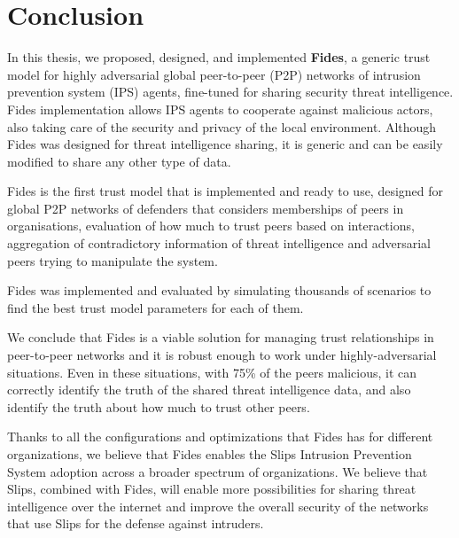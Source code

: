 \chapter{Conclusion}
\label{ch:conclusion}

In this thesis, we proposed, designed, and implemented \textbf{Fides}, a generic trust model for highly adversarial global peer-to-peer (P2P) networks of intrusion prevention system (IPS) agents, fine-tuned for sharing security threat intelligence. Fides implementation allows IPS agents to cooperate against malicious actors, also taking care of the security and privacy of the local environment. 
Although Fides was designed for threat intelligence sharing, it is generic and can be easily modified to share any other type of data. 

Fides is the first trust model that is implemented and ready to use, designed for global P2P networks of defenders that considers memberships of peers in organisations, evaluation of how much to trust peers based on interactions, aggregation of contradictory information of threat intelligence and adversarial peers trying to manipulate the system.

Fides was implemented and evaluated by simulating thousands of scenarios to find the best trust model parameters for each of them. 

We conclude that Fides is a viable solution for managing trust relationships in peer-to-peer networks and it is robust enough to work under highly-adversarial situations. Even in these situations, with 75\% of the peers malicious, it can correctly identify the truth of the shared threat intelligence data, and also identify the truth about how much to trust other peers.

Thanks to all the configurations and optimizations that Fides has for different organizations, we believe that Fides enables the Slips Intrusion Prevention System adoption across a broader spectrum of organizations.
We believe that Slips, combined with Fides, will enable more possibilities for sharing threat intelligence over the internet and improve the overall security of the networks that use Slips for the defense against intruders.


